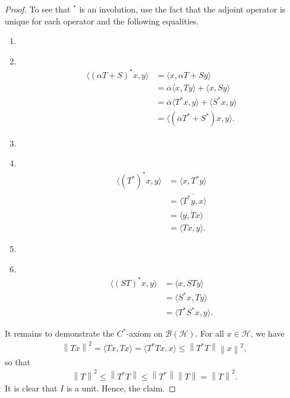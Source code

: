 \documentclass[11pt,a4paper]{report}
\theoremstyle{plain}
\theoremstyle{definition}
\newcommand{\1}{\mathbbm{1}}
\renewcommand{\H}{\mathcal{H}}
\newcommand{\B}{\mathcal{B}}
\newcommand{\BH}{\mathcal{\B(\H)}}
\newcommand\Item[1][]{ 						%
  \ifx\relax#1\relax  \item \else \item[#1] \fi
  \abovedisplayskip=0pt\abovedisplayshortskip=0pt~\vspace*{-\baselineskip}}
\begin{document}
\begin{proof}
	To see that $^\ast$ is an involution, use the fact that the adjoint 
	operator is unique for each operator and the following equalities.
	\begin{enumerate}
	\Item	\begin{align*}
				\langle (\alpha T+S)^\ast x,y\rangle 
			&=	\langle x, \alpha T+S y \rangle												\\
			&=	\overline{\alpha}\langle x,Ty\rangle + \langle x, Sy \rangle				\\
			&=	\overline{\alpha}\langle T^\ast x,y\rangle +
										 \langle S^\ast x, y \rangle						\\
			&=	\langle(\overline{\alpha} T^\ast + S^\ast) x, y \rangle.
			\end{align*}
	\Item 	\begin{align*}
				\langle (T^\ast)^\ast x,y\rangle 
			&=	\langle x, T^\ast y \rangle													\\
			&=	\overline{\langle T^\ast y,x \rangle}										\\
			&=	\overline{\langle y, Tx \rangle}											\\
			&=	\langle Tx,y\rangle.
			\end{align*}
	\Item	\begin{align*}
				\langle (ST)^\ast x,y \rangle
			&=	\langle x, STy \rangle														\\
			&=	\langle	S^\ast x,Ty \rangle													\\
			&=	\langle T^\ast S^\ast x,y \rangle.
		\end{align*}
	\end{enumerate}
	It remains to demonstrate the $C^\ast$-axiom on $\BH$. For all $x\in\H$, we have
	\begin{align*}
		\left\|Tx\right\|^2 = \langle Tx,Tx\rangle 
							=  \langle T^\ast Tx,x\rangle 
							\leq \left\|T^\ast T\right\| \left\|x\right\|^2,
	\end{align*}
	so that
	\begin{align*}
		\left\|T\right\|^2 	\leq \left\|T^\ast T\right\| 
							\leq \left\|T^\ast\right\| \left\|T\right\| 
							= \left\|T\right\|^2.
	\end{align*}
	It is clear that $I$ is a unit.
	Hence, the claim.
\end{proof} 
\end{document}
